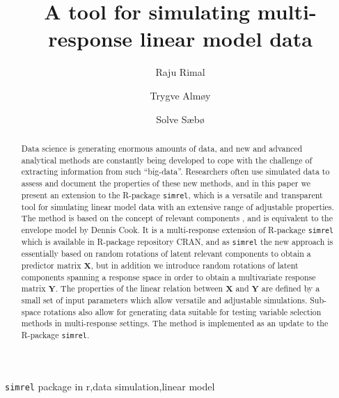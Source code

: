\documentclass[review]{elsarticle}
\theoremstyle{definition}
\theoremstyle{definition}
\theoremstyle{definition}
\theoremstyle{remark}
\begin{document}
\begin{frontmatter}

  \title{A tool for simulating multi-response linear model data}
  
    \author[KBM]{Raju Rimal}
    \author[KBM]{Trygve Almøy}
  
    \author[NMBU]{Solve Sæbø}
  
      \address[KBM]{Faculty of Chemistry and Bioinformatics, Norwegian University of Life
Sciences, Ås, Norway}
    \address[NMBU]{Prorector, Norwegian University of Life Sciences, Ås, Norway}
  
  \begin{abstract}
  Data science is generating enormous amounts of data, and new and
  advanced analytical methods are constantly being developed to cope with
  the challenge of extracting information from such ``big-data''.
  Researchers often use simulated data to assess and document the
  properties of these new methods, and in this paper we present an
  extension to the R-package \texttt{simrel}, which is a versatile and
  transparent tool for simulating linear model data with an extensive
  range of adjustable properties. The method is based on the concept of
  relevant components \citep{helland1994comparison}, and is equivalent to
  the envelope model by Dennis Cook. It is a multi-response extension of
  R-package \texttt{simrel} which is available in R-package repository
  CRAN, and as \texttt{simrel} the new approach is essentially based on
  random rotations of latent relevant components to obtain a predictor
  matrix \(\mathbf{X}\), but in addition we introduce random rotations of
  latent components spanning a response space in order to obtain a
  multivariate response matrix \(\mathbf{Y}\). The properties of the
  linear relation between \(\mathbf{X}\) and \(\mathbf{Y}\) are defined by
  a small set of input parameters which allow versatile and adjustable
  simulations. Sub-space rotations also allow for generating data suitable
  for testing variable selection methods in multi-response settings. The
  method is implemented as an update to the R-package \texttt{simrel}.
  \end{abstract}
   \begin{keyword} \texttt{simrel} package in r,data simulation,linear model\end{keyword}

\end{frontmatter}
\end{document}
